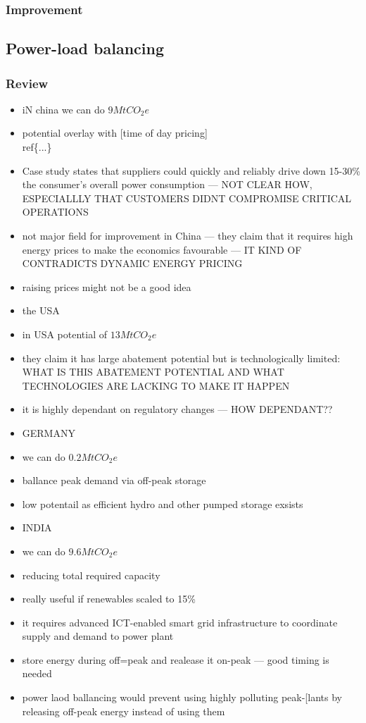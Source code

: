 \documentclass[11pt, twocolumn]{article}
\begin{document}
\subsubsection{Improvement}

\subsection{Power-load balancing}
\subsubsection{Review}
\begin{itemize}
\item iN china we can do $9 Mt CO_2e$
\item potential overlay with  [time of day pricing]\\ref\{...\}
\item Case study states that suppliers could quickly and reliably drive down 15-30\% the consumer's overall power consumption --- NOT CLEAR HOW, ESPECIALLLY THAT CUSTOMERS DIDNT COMPROMISE CRITICAL OPERATIONS
\item not major field for improvement in China --- they claim that it requires high energy prices to make the economics favourable --- IT KIND OF CONTRADICTS DYNAMIC ENERGY PRICING
\item raising prices might not be a good idea

\item the USA
\item in USA potential of $13 MtCO_2e$
\item they claim it has large abatement potential but is technologically limited: WHAT IS THIS ABATEMENT POTENTIAL AND WHAT TECHNOLOGIES ARE LACKING TO MAKE IT HAPPEN
\item it is highly dependant on regulatory changes --- HOW DEPENDANT??

\item GERMANY
\item we can do $0.2 Mt CO_2e$
\item ballance peak demand via off-peak storage
\item low potentail as efficient hydro and other pumped storage exsists


\item INDIA
\item we can do $9.6 Mt CO_2e$
\item reducing total required capacity
\item really useful if renewables scaled to 15\%
\item it requires advanced ICT-enabled smart grid infrastructure to coordinate supply and demand to power plant
\item store energy during off=peak and realease it on-peak --- good timing is needed
\item power laod ballancing would prevent using highly polluting peak-[lants by releasing off-peak energy instead of using them

\end{itemize}
\end{document}
